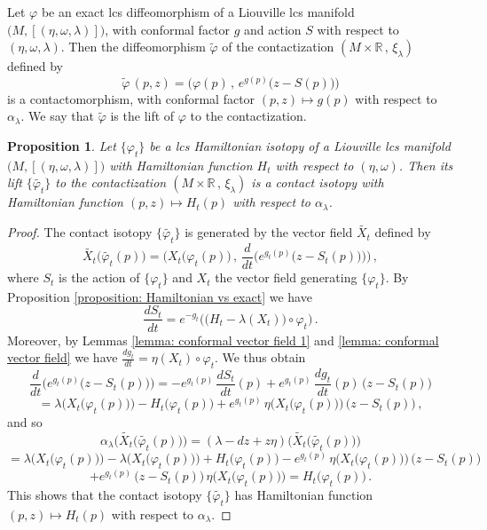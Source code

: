 \documentclass{amsart}
\newtheorem{prop}[thm]{Proposition}
\theoremstyle{remark}
\begin{document}
Let $\varphi$ be an exact lcs diffeomorphism
of a Liouville lcs manifold $\big( M , [(\eta, \omega, \lambda)] \big)$,
with conformal factor $g$ and action $S$
with respect to $(\eta, \omega, \lambda)$.
Then the diffeomorphism $\widetilde{\varphi}$
of the contactization $(M \times \mathbb{R} \,,\, \xi_{\lambda})$
defined by
\[
\widetilde{\varphi} \, (p, z)
= \Big( \varphi(p) \,,\, e^{g(p)} \big( z - S(p) \big) \Big)
\]
is a contactomorphism,
with conformal factor $(p, z) \mapsto g(p)$
with respect to $\alpha_{\lambda}$.
We say that $\widetilde{\varphi}$ is the lift of $\varphi$
to the contactization.

\begin{prop}\label{proposition: lift of lcs Hamiltonian isotopy to the contactization}
Let $\{\varphi_t\}$ be a lcs Hamiltonian isotopy
of a Liouville lcs manifold $\big( M , [(\eta, \omega, \lambda)] \big)$
with Hamiltonian function $H_t$
with respect to $(\eta, \omega)$.
Then its lift $\{\widetilde{\varphi_t}\}$
to the contactization $( M \times \mathbb{R} \,,\, \xi_{\lambda})$
is a contact isotopy with Hamiltonian function
$(p, z) \mapsto H_t(p)$
with respect to $\alpha_{\lambda}$.
\end{prop}

\begin{proof}
The contact isotopy $\{\widetilde{\varphi_t}\}$
is generated by the vector field $\widetilde{X_t}$
defined by
$$
\widetilde{X_t} \big( \widetilde{\varphi_t}(p) \big)
= \Big( X_t \big( \varphi_t (p)\big) \,,\,
\frac{d}{dt} \Big( e^{g_t(p)} \big( z - S_t(p) \big) \Big)  \Big) \,,
$$
where $S_t$ is the action of $\{\varphi_t\}$
and $X_t$ the vector field generating $\{\varphi_t\}$.
By Proposition \ref{proposition: Hamiltonian vs exact}
we have
$$
\frac{dS_t}{dt} =
e^{-g_t} \Big( \big( H_t - \lambda (X_t) \big) \circ \varphi_t \Big) \,.
$$
Moreover,
by Lemmas \ref{lemma: conformal vector field 1}
and \ref{lemma: conformal vector field}
we have $\frac{dg_t}{dt} = \eta (X_t) \circ \varphi_t$.
We thus obtain
\[
\frac{d}{dt} \Big( e^{g_t(p)} \big( z - S_t(p) \big) \Big)
= - e^{g_t(p)} \, \frac{d S_t}{dt} (p) + e^{g_t(p)} \, \frac{d g_t}{dt} (p) \, \big( z - S_t(p) \big)
\]
\[
= \lambda \Big( X_t \big( \varphi_t (p) \big) \Big) - H_t \big( \varphi_t (p) \big)
+ e^{g_t(p)} \, \eta \Big( X_t \big( \varphi_t (p) \big) \Big) \, \big( z - S_t(p) \big) \,,
\]
and so
\[
\alpha_{\lambda} \Big( \widetilde{X_t} \big( \widetilde{\varphi_t}(p) \big) \Big)
= (\lambda - dz + z \eta)
\Big( \widetilde{X_t} \big( \widetilde{\varphi_t}(p) \big) \Big)
\]
\[
= \lambda \Big( X_t \big( \varphi_t (p) \big) \Big) - \lambda \Big( X_t \big( \varphi_t (p) \big) \Big)
+ H_t \big( \varphi_t (p) \big)
- e^{g_t(p)} \, \eta \Big( X_t \big( \varphi_t (p) \big) \Big) \, \big( z - S_t(p) \big)
\]
\[
+ e^{g_t(p)} \, \big( z - S_t(p) \big) \, \eta \Big( X_t \big( \varphi_t (p) \big) \Big)
= H_t \big( \varphi_t (p) \big) \,.
\]
This shows that the contact isotopy $\{\widetilde{\varphi_t}\}$
has Hamiltonian function $(p, z) \mapsto H_t(p)$
with respect to $\alpha_{\lambda}$.
\end{proof}
\end{document}

